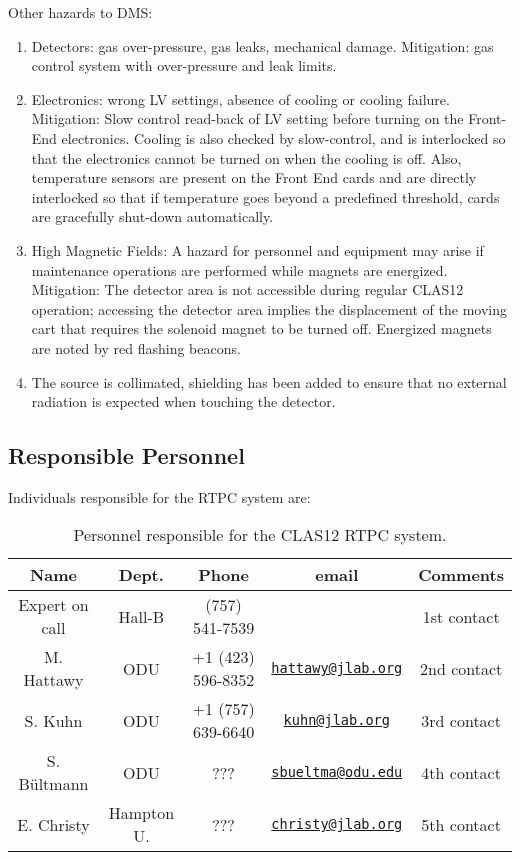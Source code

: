 Other hazards to DMS:
\begin{enumerate}
\item Detectors: gas over-pressure, gas leaks, mechanical damage. Mitigation: gas control system with over-pressure and leak limits. 
\item Electronics: wrong LV settings, absence of cooling or cooling failure. Mitigation: Slow control read-back of LV setting before turning on the Front-End electronics. Cooling is also checked by slow-control, and is interlocked so that the electronics cannot be turned on when the cooling is off. Also, temperature sensors are present on the Front End cards and are directly interlocked so that if temperature goes beyond a predefined threshold, cards are gracefully shut-down automatically.
\item High Magnetic Fields: A hazard for personnel and equipment may arise if maintenance operations are performed while magnets are energized. Mitigation: The detector area is not accessible during regular CLAS12 operation; accessing the detector area implies the displacement of the moving cart that requires the solenoid magnet to be turned off. Energized magnets are noted by red flashing beacons.
\item The source is collimated, shielding has been added to ensure that no external radiation is expected when touching the detector.
\end{enumerate}

\subsection{Responsible Personnel}

Individuals responsible for the RTPC system are:

\begin{table}[!htb]
\centering
\begin{tabular}{|c|c|c|c|c|} \hline
Name&Dept.&Phone&email&Comments \\ \hline
Expert on call&Hall-B &(757) 541-7539&& 1st contact \\ \hline
M. Hattawy &ODU&+1 (423) 596-8352&\href{mailto:hattawy@jlab.org}{\nolinkurl{hattawy@jlab.org}}&2nd contact \\ \hline
S. Kuhn&ODU&+1 (757) 639-6640&\href{mailto:kuhn@jlab.org}{\nolinkurl{kuhn@jlab.org}}&3rd contact \\ \hline
S. B\"ultmann&ODU&???&\href{mailto:sbueltma@odu.edu}{\nolinkurl{sbueltma@odu.edu}}&4th contact \\ \hline
E. Christy&Hampton U.&???&\href{mailto:christy@jlab.org}{\nolinkurl{christy@jlab.org}}&5th contact \\ \hline
\end{tabular}
\caption{Personnel responsible for the CLAS12 RTPC system.} 
\label{tb:rtpc}
\end{table}

